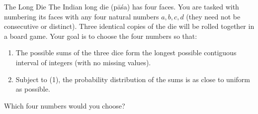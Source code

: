 \begin{problem}{The Long Die}
The Indian long die (pāśa) has four faces. You are tasked with numbering its faces with any four natural numbers \(a,b,c,d\) (they need not be consecutive or distinct). Three identical copies of the die will be rolled together in a board game. Your goal is to choose the four numbers so that:
    \begin{enumerate}
        \item The possible sums of the three dice form the longest possible contiguous interval of integers (with no missing values).
        \item Subject to (1), the probability distribution of the sums is as close to uniform as possible.
    \end{enumerate}
Which four numbers would you choose?
\end{problem}